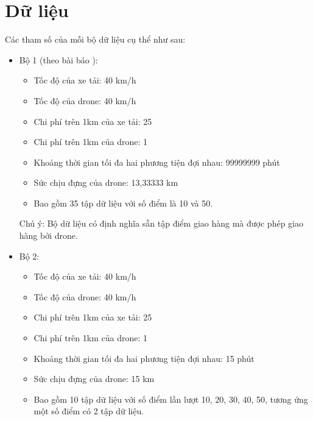\documentclass[a4paper,12pt]{report}
\begin{document}
\section{Dữ liệu}
Các tham số của mỗi bộ dữ liệu cụ thể như sau:
\begin{itemize}
\item Bộ 1 (theo bài báo \cite{main}): 
\begin{itemize}
\item Tốc độ của xe tải: 40 km/h
\item Tốc độ của drone: 40 km/h
\item Chi phí trên 1km của xe tải: 25
\item Chi phí trên 1km của drone: 1
\item Khoảng thời gian tối đa hai phương tiện đợi nhau: 99999999 phút
\item Sức chịu đựng của drone: 13,33333 km
\item Bao gồm 35 tập dữ liệu với số điểm là 10 và 50.
\end{itemize}
Chú ý: Bộ dữ liệu có định nghĩa sẵn tập điểm giao hàng mà được phép giao hàng bởi drone.
\item Bộ 2: 
\begin{itemize}
\item Tốc độ của xe tải: 40 km/h
\item Tốc độ của drone: 40 km/h
\item Chi phí trên 1km của xe tải: 25
\item Chi phí trên 1km của drone: 1
\item Khoảng thời gian tối đa hai phương tiện đợi nhau: 15 phút
\item Sức chịu đựng của drone: 15 km
\item Bao gồm 10 tập dữ liệu với số điểm lần lượt 10, 20, 30, 40, 50, tương ứng một số điểm có 2 tập dữ liệu. 
\end{itemize}
\end{itemize}
\end{document}
